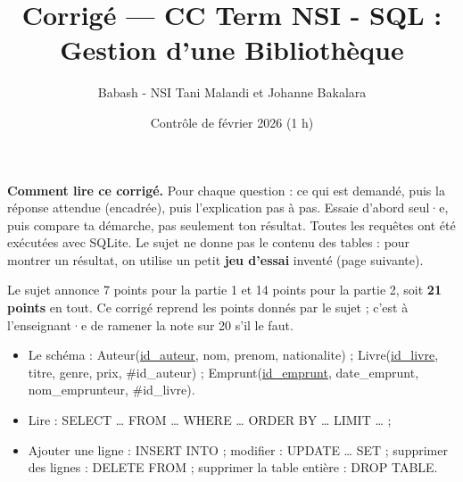 \documentclass[11pt, a4paper]{exam}
\title{Corrigé — CC Term NSI - SQL : Gestion d'une Bibliothèque}
\author{Babash - NSI Tani Malandi et Johanne Bakalara}
\date{Contrôle de février 2026 (1 h)}
\newcommand{\sql}[1]{\textsc{#1}}
\begin{document}
\pagestyle{headandfoot}
\firstpageheader{}{}{}
\runningheadrule
{}

\maketitle
\thispagestyle{headandfoot}

\begin{tcolorbox}[colback=white, colframe=black, boxrule=0.5pt, arc=1mm, left=2mm, right=2mm]
\small\textbf{Comment lire ce corrigé.} Pour chaque question : ce qui est demandé, puis la réponse attendue (encadrée), puis l'explication pas à pas. Essaie d'abord seul·e, puis compare ta démarche, pas seulement ton résultat.
Toutes les requêtes ont été exécutées avec SQLite. Le sujet ne donne pas le contenu des tables : pour montrer un résultat, on utilise un petit \textbf{jeu d'essai} inventé (page suivante).
\end{tcolorbox}

\begin{remarque}
Le sujet annonce 7 points pour la partie 1 et 14 points pour la partie 2, soit \textbf{21 points} en tout. Ce corrigé reprend les points donnés par le sujet ; c'est à l'enseignant·e de ramener la note sur 20 s'il le faut.
\end{remarque}

\begin{retenir}
\begin{itemize}
\item Le schéma : Auteur(\underline{id\_auteur}, nom, prenom, nationalite) ; Livre(\underline{id\_livre}, titre, genre, prix, \#id\_auteur) ; Emprunt(\underline{id\_emprunt}, date\_emprunt, nom\_emprunteur, \#id\_livre).
\item Lire : \sql{SELECT} \ldots{} \sql{FROM} \ldots{} \sql{WHERE} \ldots{} \sql{ORDER BY} \ldots{} \sql{LIMIT} \ldots{} ;
\item Ajouter une ligne : \sql{INSERT INTO} ; modifier : \sql{UPDATE} \ldots{} \sql{SET} ; supprimer des lignes : \sql{DELETE FROM} ; supprimer la table entière : \sql{DROP TABLE}.
\end{itemize}
\end{retenir}
\end{document}
